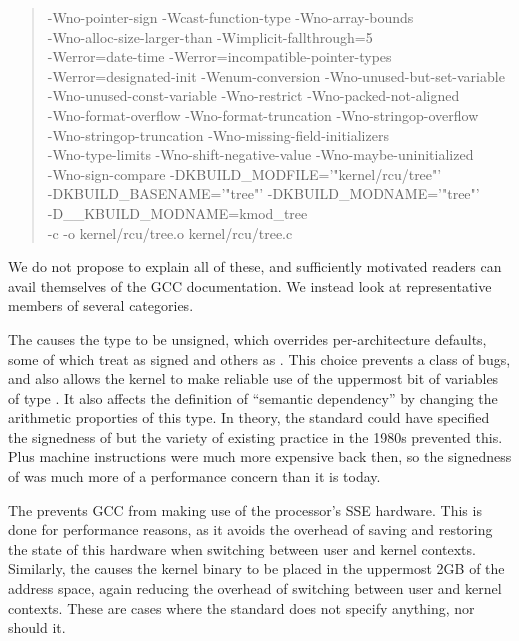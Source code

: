\documentclass[10]{article}
\begin{document}
\begin{quote}
{{	-Wno-pointer-sign -Wcast-function-type -Wno-array-bounds \\
	-Wno-alloc-size-larger-than -Wimplicit-fallthrough=5 \\
	-Werror=date-time -Werror=incompatible-pointer-types \\
	-Werror=designated-init -Wenum-conversion
	-Wno-unused-but-set-variable \\
	-Wno-unused-const-variable -Wno-restrict -Wno-packed-not-aligned \\
	-Wno-format-overflow 
	-Wno-format-truncation -Wno-stringop-overflow \\
	-Wno-stringop-truncation
	-Wno-missing-field-initializers \\
	-Wno-type-limits
	-Wno-shift-negative-value -Wno-maybe-uninitialized \\
	-Wno-sign-compare 
	-DKBUILD\_MODFILE='"kernel/rcu/tree"' \\
	-DKBUILD\_BASENAME='"tree"' -DKBUILD\_MODNAME='"tree"' \\
	-D\_\_KBUILD\_MODNAME=kmod\_tree \\
	-c -o kernel/rcu/tree.o kernel/rcu/tree.c
	}
}
\end{quote}

We do not propose to explain all of these, and sufficiently motivated
readers can avail themselves of the GCC documentation.
We instead look at representative members of several categories.

The  causes the  type to be unsigned, which
overrides per-architecture defaults, some of which treat 
as signed and others as .
This choice prevents a class of bugs, and also allows the kernel to make
reliable use of the uppermost bit of variables of type .
It also affects the definition of ``semantic dependency'' by changing
the arithmetic proporties of this type.
In theory, the standard could have specified the signedness of 
but the variety of existing practice in the 1980s prevented this.
Plus machine instructions were much more expensive back then, so the
signedness of  was much more of a performance concern than
it is today.

The  prevents GCC from making use of the processor's SSE hardware.
This is done for performance reasons, as it avoids the overhead of
saving and restoring the state of this hardware when switching between
user and kernel contexts.
Similarly, the  causes the kernel binary to be
placed in the uppermost 2GB of the address space, again reducing
the overhead of switching between user and kernel contexts.
These are cases where the standard does not specify anything, nor
should it.
\end{document}
